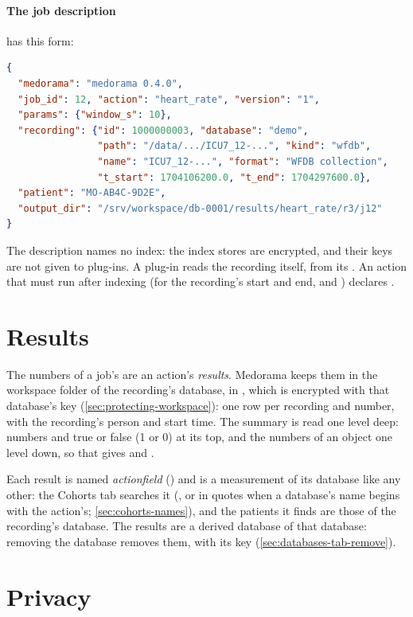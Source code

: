 \paragraph{The job description} has this form:
\begin{lstlisting}[language=JSON]
{
  "medorama": "medorama 0.4.0",
  "job_id": 12, "action": "heart_rate", "version": "1",
  "params": {"window_s": 10},
  "recording": {"id": 1000000003, "database": "demo",
                "path": "/data/.../ICU7_12-...", "kind": "wfdb",
                "name": "ICU7_12-...", "format": "WFDB collection",
                "t_start": 1704106200.0, "t_end": 1704297600.0},
  "patient": "MO-AB4C-9D2E",
  "output_dir": "/srv/workspace/db-0001/results/heart_rate/r3/j12"
}
\end{lstlisting}
The description names no index: the index stores are encrypted, and their keys are not given to
plug-ins. A plug-in reads the recording itself, from its . An action that must run
after indexing (for the recording's start and end,  and ) declares
.

\section{Results}
\label{sec:actions-results}

The numbers of a job's  are an action's \emph{results}. Medorama keeps them
in the workspace folder of the recording's database, in , which is
encrypted with that database's key (\cref{sec:protecting-workspace}): one row per recording and
number, with the recording's person and start time. The summary is read one level deep: numbers
and true or false (1 or 0) at its top, and the numbers of an object one level down, so that
 gives  and .

Each result is named \emph{action}\emph{field} () and is a
measurement of its database like any other: the Cohorts tab searches it
(, or in quotes when a database's name begins with the action's;
\cref{sec:cohorts-names}), and the patients it finds are those
of the recording's database. The results are a derived database of that database: removing the
database removes them, with its key (\cref{sec:databases-tab-remove}).

\section{Privacy}
\label{sec:actions-privacy}

